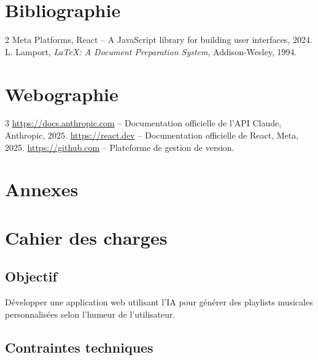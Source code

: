 \documentclass[a4paper, 12pt, twoside]{article}
\begin{document}
\newpage

\section{Bibliographie}

\renewcommand{\bibname}{}
\renewcommand{\refname}{}

\begin{thebibliography}{2}
    Meta Platforms, React -- A JavaScript library for building user interfaces, 2024.
    L. Lamport, \textit{\LaTeX : A Document Preparation System}, Addison-Wesley, 1994.
\end{thebibliography}

\newpage

\section{Webographie}

\begin{thebibliography}{3}
    \url{https://docs.anthropic.com} -- Documentation officielle de l'API Claude, Anthropic, 2025.
    \url{https://react.dev} -- Documentation officielle de React, Meta, 2025.
    \url{https://github.com} -- Plateforme de gestion de version.
\end{thebibliography}

\newpage

\section{Annexes}
\appendix
\makeatletter
\def\@seccntformat#1{Annexe~\csname the#1\endcsname:\quad}
\makeatother

\section{Cahier des charges}

\subsection*{Objectif}

Développer une application web utilisant l'IA pour générer des playlists musicales personnalisées selon l'humeur de l'utilisateur.

\subsection*{Contraintes techniques}
\end{document}
